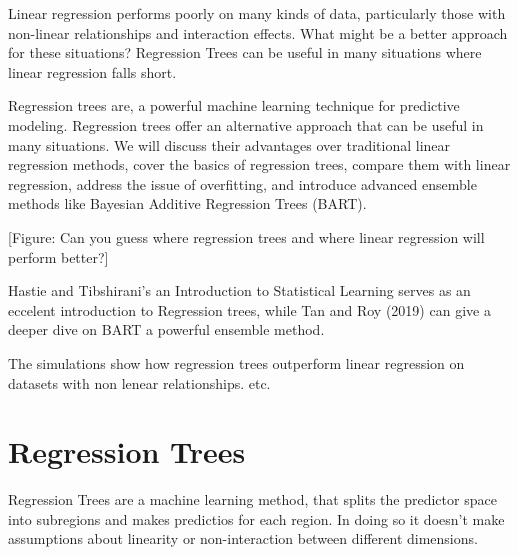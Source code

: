 \documentclass[12pt]{article}
\begin{document}

Linear regression performs poorly on many kinds of data, particularly those with non-linear relationships and interaction effects. What might be a better approach for these situations? Regression Trees can be useful in many situations where linear regression falls short.

Regression trees are, a powerful machine learning technique for predictive modeling. Regression trees offer an alternative approach that can be useful in many situations. We will discuss their advantages over traditional linear regression methods, cover the basics of regression trees, compare them with linear regression, address the issue of overfitting, and introduce advanced ensemble methods like Bayesian Additive Regression Trees (BART).

[Figure: Can you guess where regression trees and where linear regression will perform better?]




Hastie and Tibshirani's an Introduction to Statistical Learning serves as an eccelent introduction to Regression trees, while Tan and Roy (2019) can give a deeper dive on BART a powerful ensemble method. 


The simulations show how regression trees outperform linear regression on datasets with non lenear relationships. etc.






\section{Regression Trees}

Regression Trees are a machine learning method, that splits the predictor space into subregions and makes predictios for each region. In doing so it doesn't make assumptions about linearity or non-interaction between different dimensions.
\end{document}
